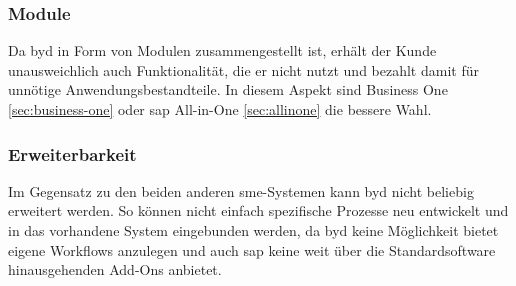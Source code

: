 \subsubsection{Module}

Da \gls{byd} in Form von Modulen zusammengestellt ist, erhält der Kunde unausweichlich auch Funktionalität, die er nicht nutzt und bezahlt damit für unnötige Anwendungsbestandteile. In diesem Aspekt sind Business One \ref{sec:business-one} oder \gls{sap} All-in-One \ref{sec:allinone} die bessere Wahl.

\subsubsection{Erweiterbarkeit}

Im Gegensatz zu den beiden anderen \gls{sme}-Systemen kann \gls{byd} nicht beliebig erweitert werden. So können nicht einfach spezifische Prozesse neu entwickelt und in das vorhandene System eingebunden werden, da \gls{byd} keine Möglichkeit bietet eigene Workflows anzulegen und auch \gls{sap} keine weit über die Standardsoftware hinausgehenden Add-Ons anbietet.

